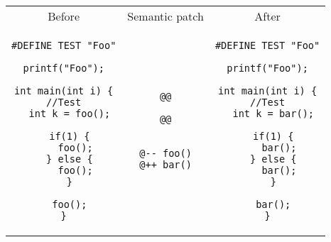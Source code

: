 \documentclass{article}
\begin{document}
\begin{tabular}{ccc}
Before & Semantic patch & After \\
\begin{minipage}[t]{.3\linewidth}
\begin{lstlisting}
#DEFINE TEST "Foo"

printf("Foo");

int main(int i) {
//Test
  int k = foo();

  if(1) {
    foo();
  } else {
    foo();
  }

  foo();
}
\end{lstlisting}
\end{minipage}
&
\begin{minipage}[t]{.3\linewidth}
\begin{lstlisting}[language=Cocci]
@@

@@


@-- foo()
@++ bar()
\end{lstlisting}
\end{minipage}
&
\begin{minipage}[t]{.3\linewidth}
\begin{lstlisting}
#DEFINE TEST "Foo"

printf("Foo");

int main(int i) {
//Test
  int k = bar();

  if(1) {
    bar();
  } else {
    bar();
  }

  bar();
}
\end{lstlisting}
\end{minipage}\\
\end{tabular}
\end{document}
